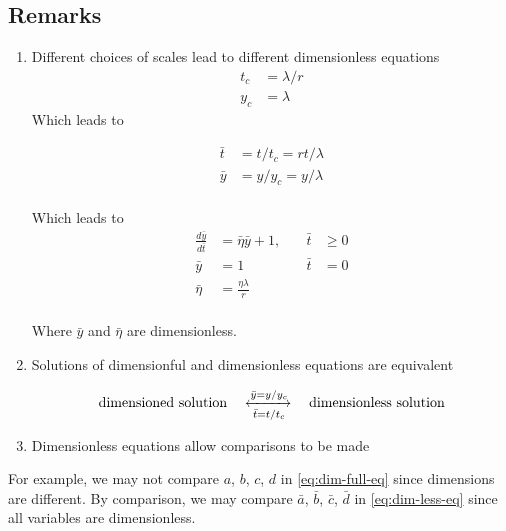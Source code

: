 \documentclass[12pt]{article}
\begin{document}
\subsection{Remarks}
\begin{enumerate}
\item Different choices of scales lead to different dimensionless equations
  \begin{equation}
    \begin{aligned}
      t_c &= \lambda/r \\
      y_c &= \lambda
    \end{aligned}
  \end{equation}
  Which leads to

  \begin{equation}
    \begin{aligned}
      \bar{t} &= t/t_c = rt/\lambda \\
      \bar{y} &= y/y_c = y/\lambda \\
    \end{aligned}
  \end{equation}


  Which leads to
  \begin{equation}
    \begin{aligned}
      \frac{d\bar{y}}{d\bar{t}} &= \bar{\eta}\bar{y} + 1, &\quad \bar{t}&\ge0 \\
      \bar{y} &= 1 &\quad \bar{t} &= 0 \\
      \bar{\eta} &= \frac{\eta\lambda}{r} \\
    \end{aligned}
  \end{equation}

  Where $\bar{y}$ and $\bar{\eta}$ are dimensionless.

\item Solutions of dimensionful and dimensionless equations are equivalent

  \begin{equation}
    \text{dimensioned solution}\quad\xleftrightarrow[\bar{t} = t/t_c]{\bar{y} = y/y_c}\quad
    \text{dimensionless solution}
  \end{equation}

\item Dimensionless equations allow comparisons to be made
\end{enumerate}

For example, we may not compare $a$, $b$, $c$, $d$ in \cref{eq:dim-full-eq}
since dimensions are different. By comparison, we may compare $\bar{a}$,
$\bar{b}$, $\bar{c}$, $\bar{d}$ in \cref{eq:dim-less-eq} since all variables are
dimensionless.
\end{document}
